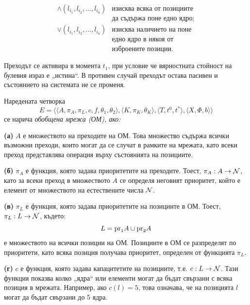 $$ \begin{array}{ll}
     \wedge(l_{i_{1}}, l_{i_{2}}, \dots, l_{i_{u}}) & \mbox{изисква всяка от позициите } \\
     & \mbox{да съдържа поне едно ядро;} \\
    \vee(l_{i_{1}}, l_{i_{2}}, \dots, l_{i_{u}}) & \mbox{изисква наличието на поне} \\
    & \mbox{едно ядро в някоя от} \\
     & \mbox{изброените позиции.}
\end{array} $$



Преходът се активира в момента $t_1$, при условие че вярностната стойност на булевия израз е „истина“. В противен случай преходът остава пасивен и състоянието на системата не се променя.

Наредената четворка
$$ E = \langle \langle A, \pi_{A}, \pi_{L}, c, f, \theta_{1}, \theta_{2} \rangle, 
\langle K, \pi_{K}, \theta_{K} \rangle, \langle T, t^{0}, t^{*} \rangle, 
\langle X, \Phi, b \rangle \rangle $$ 
се нарича \em обобщена мрежа \rm (ОМ), ако: 

{\bf (а)} $A$ е множеството на преходите на ОМ. Това множество съдържа всички възможни преходи, които могат да се случат в рамките на мрежата, като всеки преход представлява операция върху състоянията на позициите.

{\bf (б)} $\pi_{A}$ е функция, която задава приоритетите на преходите. Тоест, $\pi_{A}: A \rightarrow {\cal N}$, като за всеки преход в множеството $A$ се определя неговият приоритет, който е елемент от множеството на естествените числа ${\cal N}$.

{\bf (в)} $\pi_{L}$ е функция, която задава приоритетите на позициите в ОМ. Тоест, $\pi_{L}: L \rightarrow {\cal N}$, където:
$$L = \mbox{\mbox{pr}}_{1} A \cup \mbox{\mbox{pr}}_{2} A$$
е множеството на всички позиции на ОМ. Позициите в ОМ се разпределят по приоритети, като всяка позиция получава приоритет, определен от функцията $\pi_L$.

{\bf (г)} $c$ е функция, която задава капацитетите на позициите, т.е. $c: L \rightarrow {\cal N}$. Тази функция показва колко „ядра“ или елементи могат да бъдат свързани с всяка позиция в мрежата. Например, ако $c(l) = 5$, това означава, че на позицията $l$ могат да бъдат свързани до 5 ядра.

